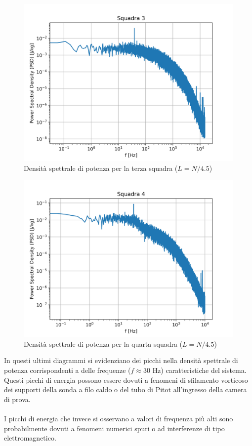 \begin{figure}[H]
    \centering
    \includegraphics[width=.84\textwidth]{images/9/sq3timeserieswelch.png}
    \caption{Densità spettrale di potenza per la terza squadra ($L=N/4.5$)}
\end{figure}

\begin{figure}[H]
    \centering
    \includegraphics[width=\textwidth]{images/9/sq4timeserieswelch.png}
    \caption{Densità spettrale di potenza per la quarta squadra ($L=N/4.5$)}
\end{figure}

\noindent In questi ultimi diagrammi si evidenziano dei picchi nella densità spettrale di potenza corrispondenti a delle frequenze ($f\approx30$ Hz) caratteristiche del sistema. Questi picchi di energia possono essere dovuti a fenomeni di sfilamento vorticoso dei supporti della sonda a filo caldo o del tubo di Pitot all'ingresso della camera di prova.\\\\
I picchi di energia che invece si osservano a valori di frequenza più alti sono probabilmente dovuti a fenomeni numerici spuri o ad interferenze di tipo elettromagnetico.